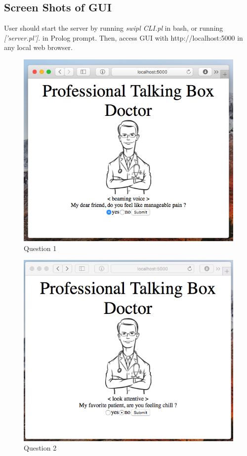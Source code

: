 \documentclass[11pt]{article}
\begin{document}
\subsection*{Screen Shots of GUI}
User should start the server by running \emph{swipl CLI.pl} in bash, or running \emph{['server.pl'].} in Prolog prompt. Then, access GUI with http://localhost:5000 in any local web browser.
\begin{figure}[H]
    \centering
  \includegraphics[scale = 0.4]{report_img/ScreenShot1.png}
  \caption{Question 1}
  \label{ss1}
\end{figure}
\begin{figure}[H]
    \centering
  \includegraphics[scale = 0.4]{report_img/ScreenShot2.png}
  \caption{Question 2}
  \label{ss2}
\end{figure}
\end{document}
